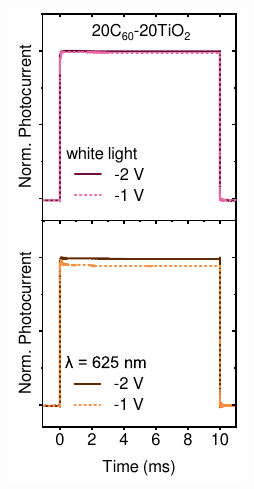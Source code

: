 \begin{figure}[htbp]
\begin{subfigure}{0.24\textwidth}
        \caption{}
        \label{}
    \end{subfigure}
    \hfill
    \begin{subfigure}{0.24\textwidth}
        \centering
        \includegraphics[width=\textwidth]{chapters/transport_layers/images/TPC_20_20.pdf}

\end{subfigure}
\end{figure}
